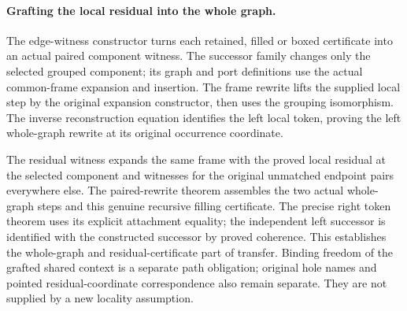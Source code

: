 \par{}

\paragraph{Grafting the local residual into the whole graph.}
The edge-witness constructor turns each retained, filled or boxed
certificate into an actual paired component witness. The successor family
changes only the selected grouped component; its graph and port definitions
use the actual common-frame expansion and insertion. The frame rewrite
lifts the supplied local step by the original expansion constructor, then
uses the grouping isomorphism. The inverse reconstruction equation
identifies the left local token, proving the left whole-graph rewrite at
its original occurrence coordinate.

The residual witness expands the same frame with the proved local residual
at the selected component and witnesses for the original unmatched endpoint pairs everywhere
else. The paired-rewrite theorem assembles the two actual whole-graph
steps and this genuine recursive filling certificate. The precise right
token theorem uses its explicit attachment equality; the independent left
successor is identified with the constructed successor by proved
coherence. This establishes the whole-graph and residual-certificate part
of transfer. Binding freedom of the grafted shared context is a separate
path obligation; original hole names and pointed residual-coordinate
correspondence also remain separate. They are not supplied by a new locality
assumption.

